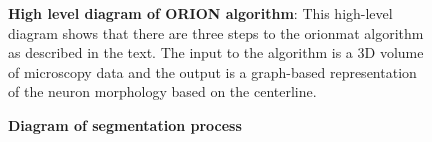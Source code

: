 \begin{figure}
\centering
\resizebox{1.0\textwidth}{!}{}
\caption[High level diagram of ORION algorithm]{\textbf{High level
diagram of ORION algorithm}: This high-level diagram shows that
there are three steps to the \gls{orionmat} algorithm as described
in the text. The input to the algorithm is a 3D volume of
microscopy data and the output is a graph-based representation of
the neuron morphology based on the centerline.}\label{fig:high-level-arch}
\end{figure}



\begin{figure}
\centering
\resizebox{1.0\textwidth}{!}{}
\caption[Diagram of segmentation process]{\textbf{Diagram of segmentation process}%
}\label{fig:proc-segmentation}
\end{figure}

